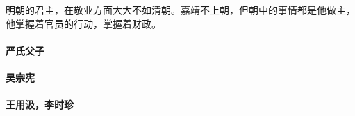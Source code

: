 明朝的君主，在敬业方面大大不如清朝。嘉靖不上朝，但朝中的事情都是他做主，他掌握着官员的行动，掌握着财政。

\paragraph{严氏父子}

\paragraph{吴宗宪}

\paragraph{王用汲，李时珍}
